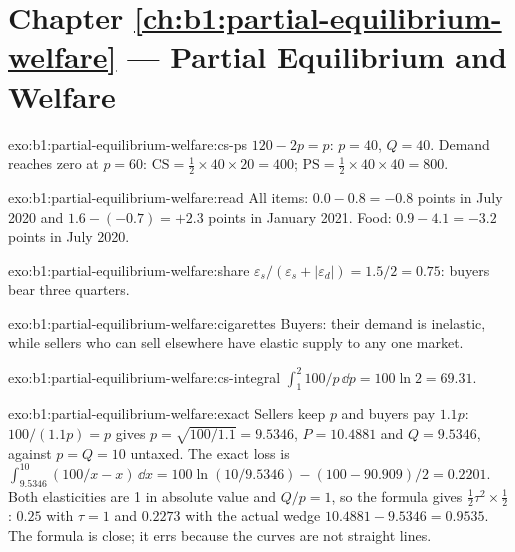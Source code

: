 \section*{Chapter \ref{ch:b1:partial-equilibrium-welfare} --- Partial Equilibrium and Welfare}

\begin{solution}{exo:b1:partial-equilibrium-welfare:cs-ps}
$120 - 2p = p$: $p = 40$, $Q = 40$. Demand reaches zero at $p = 60$:
$\mathrm{CS} = \tfrac12 \times 40 \times 20 = 400$; $\mathrm{PS} = \tfrac12 \times 40 \times 40 = 800$.
\end{solution}

\begin{solution}{exo:b1:partial-equilibrium-welfare:read}
All items: $0.0 - 0.8 = -0.8$ points in July 2020 and $1.6 - (-0.7) = +2.3$ points in
January 2021. Food: $0.9 - 4.1 = -3.2$ points in July 2020.
\end{solution}

\begin{solution}{exo:b1:partial-equilibrium-welfare:share}
$\varepsilon_s/(\varepsilon_s + |\varepsilon_d|) = 1.5/2 = 0.75$: buyers bear three quarters.
\end{solution}

\begin{solution}{exo:b1:partial-equilibrium-welfare:cigarettes}
Buyers: their demand is inelastic, while sellers who can sell elsewhere
have elastic supply to any one market.
\end{solution}

\begin{solution}{exo:b1:partial-equilibrium-welfare:cs-integral}
$\int_1^2 100/p\,\dd p = 100\ln 2 = 69.31$.
\end{solution}

\begin{solution}{exo:b1:partial-equilibrium-welfare:exact}
Sellers keep $p$ and buyers pay $1.1p$: $100/(1.1p) = p$ gives $p = \sqrt{100/1.1} = 9.5346$,
$P = 10.4881$ and $Q = 9.5346$, against $p = Q = 10$ untaxed. The exact loss is
$\int_{9.5346}^{10}(100/x - x)\,\dd x = 100\ln(10/9.5346) - (100 - 90.909)/2 = 0.2201$. Both
elasticities are 1 in absolute value and $Q/p = 1$, so the formula gives
$\tfrac12\tau^2 \times \tfrac12$: $0.25$ with $\tau = 1$ and $0.2273$ with the actual wedge
$10.4881 - 9.5346 = 0.9535$. The formula is close; it errs because the curves
are not straight lines.
\end{solution}

